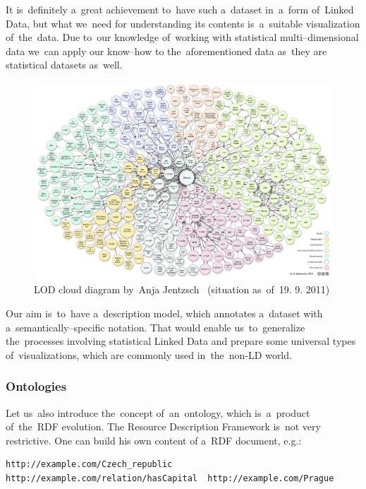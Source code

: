 It is~definitely a~great achievement to~have such a~dataset in~a~form of~Linked Data, but
what we~need for understanding its contents is~a~suitable visualization of~the~data.
Due to~our knowledge of~working with statistical multi--dimensional data we~can apply our know--how
to the~aforementioned data as~they are statistical datasets as~well.

\begin{figure}
	\centering
	\includegraphics[width=150mm]{img/lod-cloud.png}
	\caption{LOD cloud diagram by~Anja Jentzsch~\cite{lod-cloud} (situation as~of~19. 9. 2011)}
	\label{fig:lod-cloud}
\end{figure}

Our aim is~to~have a~description model, which annotates a~dataset with a~semantically--specific
notation. That would enable us~to~generalize the~processes involving statistical Linked Data
and prepare some universal types of~visualizations, which are commonly used in~the~non-LD world.

\subsubsection{Ontologies}

Let us~also introduce the~concept of~an~ontology, which is~a~product of~the~RDF evolution.
The Resource Description Framework is~not very restrictive. One can build his own content
of a~RDF document, e.g.:

\scriptsize\begin{verbatim}
http://example.com/Czech_republic	http://example.com/relation/hasCapital	http://example.com/Prague
\end{verbatim}\normalsize

